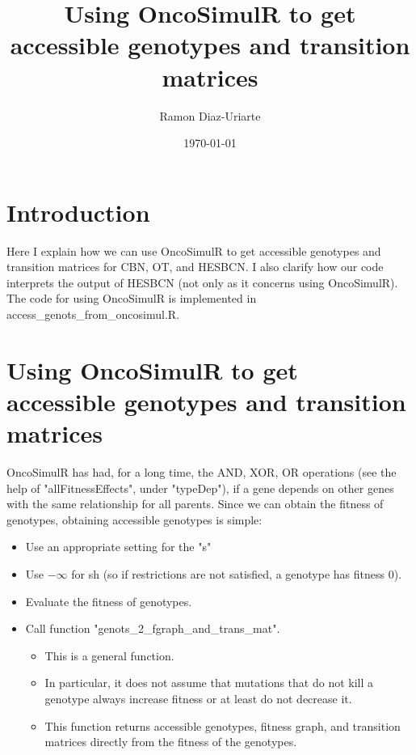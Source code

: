 \documentclass[11pt]{article}
\author{Ramon Diaz-Uriarte}
\date{\today}
\title{Using OncoSimulR to get accessible genotypes and transition matrices}
\begin{document}
\maketitle
\tableofcontents



\section{Introduction}
\label{sec:org58f26ba}
Here I explain how we can use OncoSimulR to get accessible genotypes and transition matrices for CBN, OT, and HESBCN. I also clarify how our code interprets the output of HESBCN (not only as it concerns using OncoSimulR). The code for using OncoSimulR is implemented in access\_genots\_from\_oncosimul.R. 

\section{Using OncoSimulR to get accessible genotypes and transition matrices}
\label{sec:org653c242}

OncoSimulR has had, for a long time, the AND, XOR, OR operations (see the help of "allFitnessEffects", under "typeDep"), if a gene depends on other genes with the same relationship for all parents. Since we can obtain the fitness of genotypes, obtaining accessible genotypes is simple:


\begin{itemize}
\item Use an appropriate setting for the "s"
\item Use \(-\infty\) for sh (so if restrictions are not satisfied, a genotype has
fitness 0).
\item Evaluate the fitness of genotypes.
\item Call function "genots\_2\_fgraph\_and\_trans\_mat".
\begin{itemize}
\item This is a general function.
\item In particular, it does not assume that mutations that do not kill a
genotype always increase fitness or at least do not decrease it.
\item This function returns accessible genotypes, fitness graph, and transition matrices directly from the fitness of the genotypes.
\end{itemize}
\end{itemize}
\end{document}
